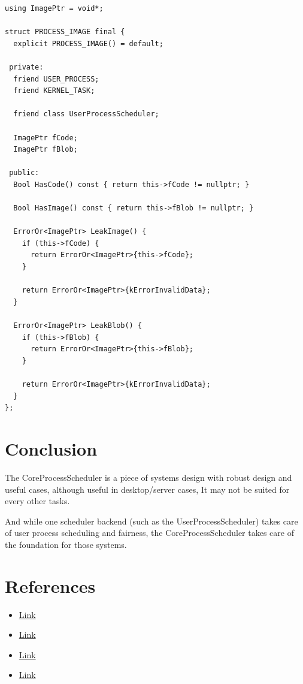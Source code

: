 \documentclass[11pt, a4paper]{article}
\begin{document}
\begin{lstlisting}
using ImagePtr = void*;

struct PROCESS_IMAGE final {
  explicit PROCESS_IMAGE() = default;

 private:
  friend USER_PROCESS;
  friend KERNEL_TASK;

  friend class UserProcessScheduler;

  ImagePtr fCode;
  ImagePtr fBlob;

 public:
  Bool HasCode() const { return this->fCode != nullptr; }

  Bool HasImage() const { return this->fBlob != nullptr; }

  ErrorOr<ImagePtr> LeakImage() {
    if (this->fCode) {
      return ErrorOr<ImagePtr>{this->fCode};
    }

    return ErrorOr<ImagePtr>{kErrorInvalidData};
  }

  ErrorOr<ImagePtr> LeakBlob() {
    if (this->fBlob) {
      return ErrorOr<ImagePtr>{this->fBlob};
    }

    return ErrorOr<ImagePtr>{kErrorInvalidData};
  }
};
\end{lstlisting}

\section{Conclusion}

{The CoreProcessScheduler is a piece of systems design with robust design and useful cases, although useful in desktop/server cases, It may not be suited for every other tasks.}

{And while one scheduler backend (such as the UserProcessScheduler) takes care of user process scheduling and fairness, the CoreProcessScheduler takes care of the foundation for those systems.}

\section{References}

{
\begin{itemize}
    \item[CoreProcessScheduler:] \href{https://github.com/nekernel-org/nekernel/blob/develop/src/kernel/KernelKit/CoreProcessScheduler.h}{Link}
    \item[NeKernel.org:] \href{https://nekernel.org/nekernel}{Link}
    \item[Round Robin (OSTEP):] \href{https://pages.cs.wisc.edu/~remzi/OSTEP/cpu-sched.pdf}{Link}
    \item[Processor Affinity:] \href{https://www.tmurgent.com/WhitePapers/ProcessorAffinity.pdf}{Link}
\end{itemize}
}
\end{document}
